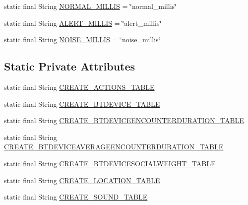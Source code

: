 \begin{DoxyCompactItemize}
\item 
static final String \hyperlink{classcs_1_1usense_1_1db_1_1_usense_s_q_lite_helper_ab5a2cc72b18ae7db2f7a1f877d79681e}{N\+O\+R\+M\+A\+L\+\_\+\+M\+I\+L\+L\+I\+S} = \char`\"{}normal\+\_\+millis\char`\"{}
\item 
static final String \hyperlink{classcs_1_1usense_1_1db_1_1_usense_s_q_lite_helper_a250a30f8124acff4e85ee540bfaf7410}{A\+L\+E\+R\+T\+\_\+\+M\+I\+L\+L\+I\+S} = \char`\"{}alert\+\_\+millis\char`\"{}
\item 
static final String \hyperlink{classcs_1_1usense_1_1db_1_1_usense_s_q_lite_helper_a29473a18d1b8cab5d836c1e88125a888}{N\+O\+I\+S\+E\+\_\+\+M\+I\+L\+L\+I\+S} = \char`\"{}noise\+\_\+millis\char`\"{}
\end{DoxyCompactItemize}
\subsection*{Static Private Attributes}
\begin{DoxyCompactItemize}
\item 
static final String \hyperlink{classcs_1_1usense_1_1db_1_1_usense_s_q_lite_helper_a5163a40861c4ee9fb293134bd6e34d9e}{C\+R\+E\+A\+T\+E\+\_\+\+A\+C\+T\+I\+O\+N\+S\+\_\+\+T\+A\+B\+L\+E}
\item 
static final String \hyperlink{classcs_1_1usense_1_1db_1_1_usense_s_q_lite_helper_a1883296a9536bdd979761d56e46fbeec}{C\+R\+E\+A\+T\+E\+\_\+\+B\+T\+D\+E\+V\+I\+C\+E\+\_\+\+T\+A\+B\+L\+E}
\item 
static final String \hyperlink{classcs_1_1usense_1_1db_1_1_usense_s_q_lite_helper_a865eeed8f2e7fe4b1a58faabb345d96d}{C\+R\+E\+A\+T\+E\+\_\+\+B\+T\+D\+E\+V\+I\+C\+E\+E\+N\+C\+O\+U\+N\+T\+E\+R\+D\+U\+R\+A\+T\+I\+O\+N\+\_\+\+T\+A\+B\+L\+E}
\item 
static final String \hyperlink{classcs_1_1usense_1_1db_1_1_usense_s_q_lite_helper_a17a206855921b838c593e04848078d9d}{C\+R\+E\+A\+T\+E\+\_\+\+B\+T\+D\+E\+V\+I\+C\+E\+A\+V\+E\+R\+A\+G\+E\+E\+N\+C\+O\+U\+N\+T\+E\+R\+D\+U\+R\+A\+T\+I\+O\+N\+\_\+\+T\+A\+B\+L\+E}
\item 
static final String \hyperlink{classcs_1_1usense_1_1db_1_1_usense_s_q_lite_helper_a4f60096ccac9316a6cdc8a3df65630d2}{C\+R\+E\+A\+T\+E\+\_\+\+B\+T\+D\+E\+V\+I\+C\+E\+S\+O\+C\+I\+A\+L\+W\+E\+I\+G\+H\+T\+\_\+\+T\+A\+B\+L\+E}
\item 
static final String \hyperlink{classcs_1_1usense_1_1db_1_1_usense_s_q_lite_helper_ac9de9d33e9877311145ff8f227d08daf}{C\+R\+E\+A\+T\+E\+\_\+\+L\+O\+C\+A\+T\+I\+O\+N\+\_\+\+T\+A\+B\+L\+E}
\item 
static final String \hyperlink{classcs_1_1usense_1_1db_1_1_usense_s_q_lite_helper_a6bb8975897d1187d215743a101a9783a}{C\+R\+E\+A\+T\+E\+\_\+\+S\+O\+U\+N\+D\+\_\+\+T\+A\+B\+L\+E}
\end{DoxyCompactItemize}


